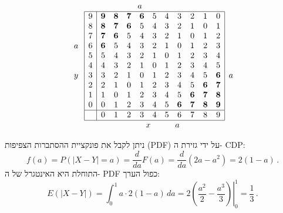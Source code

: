 \begin{table}[bt]
\[
\begin{array}{c}
\quad\\\\\\
a\\\\
\quad\\
y\\
\quad\\\quad\\\quad\\\quad
\end{array}
\begin{array}{|c|cccccccccc|}
\multicolumn{11}{l}{\qquad \qquad \qquad a}\\
\hline
9& \mathbf{9} & \mathbf{8} & \mathbf{7} & \mathbf{6} & 5 & 4 & 3 & 2 & 1 & 0  \\
8& \mathbf{8} & \mathbf{7} & \mathbf{6} & 5 & 4 & 3 & 2 & 1 & 0 & 1  \\
7& \mathbf{7} & \mathbf{6} & 5 & 4 & 3 & 2 & 1 & 0 & 1 & 2  \\
6& \mathbf{6} & 5 & 4 & 3 & 2 & 1 & 0 & 1 & 2 & 3  \\
5& 5 & 4 & 3 & 2 & 1 & 0 & 1 & 2 & 3 & 4  \\
4& 4 & 3 & 2 & 1 & 0 & 1 & 2 & 3 & 4 & 5  \\
3& 3 & 2 & 1 & 0 & 1 & 2 & 3 & 4 & 5 & \mathbf{6}  \\
2& 2 & 1 & 0 & 1 & 2 & 3 & 4 & 5 & \mathbf{6} & \mathbf{7}  \\
1& 1 & 0 & 1 & 2 & 3 & 4 & 5 & \mathbf{6} & \mathbf{7} & \mathbf{8}  \\
0& 0 & 1 & 2 & 3 & 4 & 5 & \mathbf{6} & \mathbf{7} & \mathbf{8} & \mathbf{9}  \\
\hline
&0 & 1 & 2 & 3 & 4 & 5 & 6 & 7 & 8 & 9  \\
\hline
\multicolumn{11}{c}{\quad \quad x\quad\quad\quad a}
\end{array}
\begin{array}{c}
\\\\\\
a\\\\
\end{array}
\]
\caption{התפלגות נקודות השבירה ב-%
$(0,1)\times (0,1)$}\label{t.rods}
\end{table}
ניתן לקבל את פונקציית ההסתברות הצפיפות
(PDF)
על ידי גזירת ה-%
CDP:
\[
f(a)=P(|X-Y|=a)= \frac{d}{da}F(a) =
  \frac{d}{da}(2a-a^2)=2(1-a)\,.
\]
התוחלת היא האינטגרל של ה-%
PDF
כפול הערך:
\[
E(|X-Y|)= \int_{0}^{1} a\cdot2(1-a)\, da=
  2\left.\left(\frac{a^2}{2}-\frac{a^3}{3}\right)\right|_0^1=\frac{1}{3}\,.
\]

